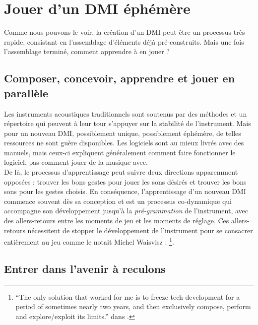 \section{Jouer d'un DMI éphémère}
\label{sec:ephemeral:playing-a-DMI}

\noindent Comme nous pouvons le voir, la création d'un \gls{DMI} peut être un processus très rapide, consistant en l'assemblage d'éléments déjà pré-construits. Mais une fois l'assemblage terminé, comment apprendre à en jouer ?

\subsection{Composer, concevoir, apprendre et jouer en parallèle}

\noindent Les instruments acoustiques traditionnels sont soutenus par des méthodes et un répertoire qui peuvent à leur tour s'appuyer sur la stabilité de l'instrument. Mais pour un nouveau \gls{DMI}, possiblement unique, possiblement éphémère, de telles ressources ne sont guère disponibles. Les logiciels sont au mieux livrés avec des manuels, mais ceux-ci expliquent généralement comment faire fonctionner le logiciel, pas comment jouer de la musique avec.\\
\indent De là, le processus d'apprentissage peut suivre deux directions apparemment opposées : trouver les bons gestes pour jouer les sons désirés et trouver les bons sons pour les gestes choisis. En conséquence, l'apprentissage d'un nouveau \gls{DMI} commence souvent dès sa conception et est un processus co-dynamique qui accompagne son développement jusqu'à la \textit{pré-grammation} de l'instrument, avec des allers-retours entre les moments de jeu et les moments de réglage. Ces allers-retours nécessitent de stopper le développement de l'instrument pour se consacrer entièrement au jeu comme le notait Michel Waisvisz : \footnote{``The only solution that worked for me is to freeze tech development for a period of sometimes nearly two years, and then exclusively compose, perform and explore/exploit its limits.'' dans \cite{wanderley_trends_2000}.}.

\subsection{Entrer dans l'avenir à reculons}

